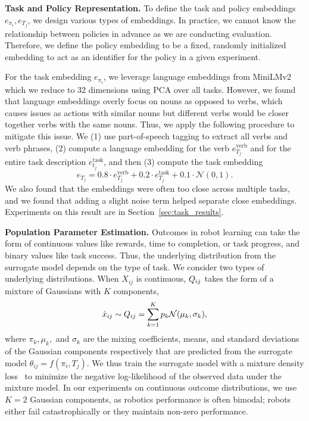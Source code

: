 \textbf{Task and Policy Representation.} 
\label{sec:method}
To define the task and policy embeddings $e_{\pi_i}, e_{T_j}$, we design various types of embeddings.
In practice, we cannot know the relationship between policies in advance as we are conducting evaluation.
Therefore, we define the policy embedding to be a fixed, randomly initialized embedding to act as an identifier for the policy in a given experiment.

For the task embedding $e_{\pi_i}$, we leverage language embeddings from MiniLMv2~\cite{gu2024minillm} which we reduce to 32 dimensions using PCA over all tasks.
However, we found that language embeddings overly focus on nouns as opposed to verbs, which causes issues as actions with similar nouns but different verbs would be closer together verbs with the same nouns. 
Thus, we apply the following procedure to mitigate this issue.
We (1) use part-of-speech tagging to extract all verbs and verb phrases, (2) compute a language embedding for the verb $e_{T_j}^{\text{verb}}$ and for the entire task description  $e_{t_j}^{\text{task}}$, and then (3) compute the task embedding 
\begin{equation}
     e_{T_j} =  0.8 \cdot e_{T_j}^{\text{verb}} +  0.2\cdot e_{T_j}^{\text{task}} + 0.1\cdot \mathcal{N}(0,1).
\end{equation}
We also found that the embeddings were often too close across multiple tasks, and we found that adding a slight noise term helped separate close embeddings.
Experiments on this result are in Section~\ref{sec:task_results}.

\textbf{Population Parameter Estimation.}
Outcomes in robot learning can take the form of continuous values like rewards, time to completion, or task progress, and binary values like task success.
Thus, the underlying distribution from the surrogate model depends on the type of task.
We consider two types of underlying distributions.
When $X_{ij}$ is continuous, $Q_{ij}$ takes the form of a mixture of Gaussians with $K$ components,
\begin{equation}
    \hat{x}_{ij} \sim Q_{ij} = \sum_{k=1}^{K}p_k\mathcal{N}(\mu_k, \sigma_k),
\end{equation}
where $\pi_k, \mu_k,$ and $\sigma_k$ are the mixing coefficients, means, and standard deviations of the Gaussian components respectively that are predicted from the surrogate model $\theta_{ij} = f(\pi_i, T_j)$.
We thus train the surrogate model with a mixture density loss~\cite{bishop1994mixture,ha2018world} to minimize the negative log-likelihood of the observed data under the mixture model.
In our experiments on continuous outcome distributions, we use $K=2$ Gaussian components, as robotics performance is often bimodal; robots either fail catastrophically or they maintain non-zero performance.

